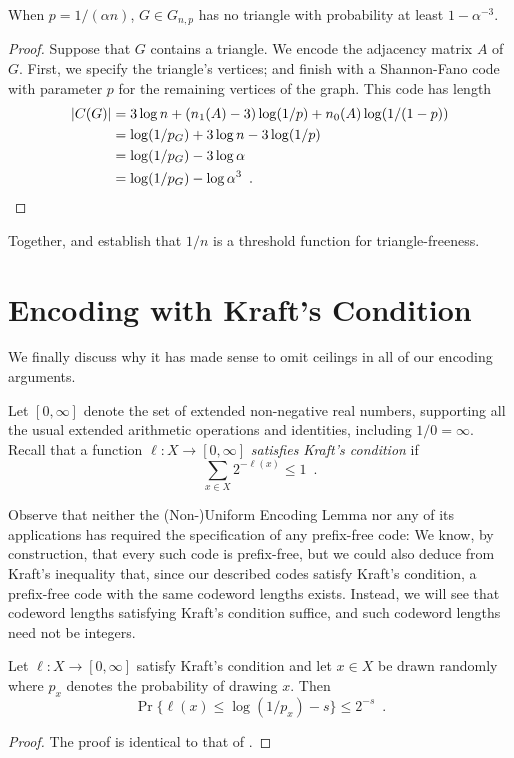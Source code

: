 \documentclass{patmorin}
\begin{document}
\begin{thm}
  When $p = 1/(\alpha n)$, $G \in G_{n, p}$ has no triangle with
  probability at least $1 - \alpha^{-3}$.
\end{thm}
\begin{proof}
  Suppose that $G$ contains a triangle. We encode the adjacency matrix
  $A$ of $G$. First, we specify the triangle's vertices; and finish
  with a Shannon-Fano code with parameter $p$ for the remaining
  vertices of the graph. This code has length
  \begin{align*}
    |C(G)| &= 3 \log n + (n_1(A) - 3) \log (1/p) + n_0(A) \log (1/(1 - p)) \\
           &= \log (1/p_G) + 3 \log n - 3 \log (1/p) \\
           &= \log (1/p_G) - 3 \log \alpha \\
           &= \log (1/p_G) - \log \alpha^3 \enspace . \qedhere
  \end{align*}
\end{proof}

Together,  and  establish
that $1/n$ is a threshold function for triangle-freeness.

\section{Encoding with Kraft's Condition}

We finally discuss why it has made sense to omit ceilings in all of
our encoding arguments.

Let $[0, \infty]$ denote the set of extended non-negative real
numbers, supporting all the usual extended arithmetic operations and
identities, including $1/0 = \infty$. Recall that a function
$\ell : X \to [0, \infty]$ \emph{satisfies Kraft's condition} if
\[
  \sum_{x \in X} 2^{-\ell(x)} \leq 1 \enspace .
\]

Observe that neither the (Non-)Uniform Encoding Lemma nor any of its
applications has required the specification of any prefix-free code:
We know, by construction, that every such code is prefix-free, but we
could also deduce from Kraft's inequality that, since our described
codes satisfy Kraft's condition, a prefix-free code with the same
codeword lengths exists. Instead, we will see that codeword lengths
satisfying Kraft's condition suffice, and such codeword lengths need
not be integers.

\begin{lem}
  Let $\ell : X \to [0, \infty]$ satisfy Kraft's condition and let
  $x\in X$ be drawn randomly where $p_x$ denotes the probability of
  drawing $x$.  Then
  \[
    \Pr\{ \ell(x) \le \log(1/p_x)-s\} \le 2^{-s} \enspace .
  \]
\end{lem}
\begin{proof}
  The proof is identical to that of .
\end{proof}
\end{document}
